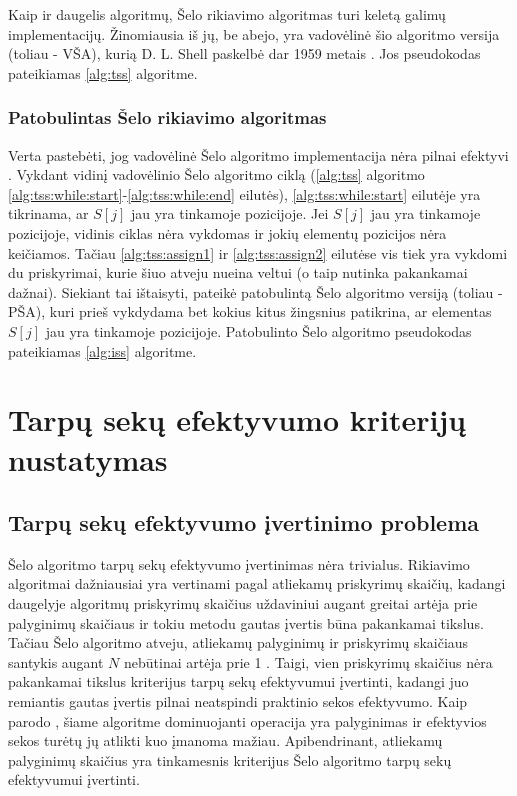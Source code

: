 \documentclass{VUMIFInfKursinis}
\begin{document}
Kaip ir daugelis algoritmų, Šelo rikiavimo algoritmas turi keletą galimų implementacijų.
Žinomiausia iš jų, be abejo, yra vadovėlinė šio algoritmo versija (toliau - VŠA),
kurią D. L. Shell paskelbė dar 1959 metais \cite{shell1959high}.
Jos pseudokodas pateikiamas \ref{alg:tss} algoritme.

\subsubsection{Patobulintas Šelo rikiavimo algoritmas}

Verta pastebėti, jog vadovėlinė Šelo algoritmo implementacija nėra pilnai efektyvi \cite{Radavičius_Baranauskas_2013}.
Vykdant vidinį vadovėlinio Šelo algoritmo ciklą (\ref{alg:tss} algoritmo \ref{alg:tss:while:start}-\ref{alg:tss:while:end} eilutės),
\ref{alg:tss:while:start} eilutėje yra tikrinama, ar $S[j]$ jau yra tinkamoje pozicijoje.
Jei $S[j]$ jau yra tinkamoje pozicijoje, vidinis ciklas nėra vykdomas ir jokių elementų pozicijos nėra keičiamos.
Tačiau \ref{alg:tss:assign1} ir \ref{alg:tss:assign2} eilutėse vis tiek yra vykdomi du priskyrimai,
kurie šiuo atveju nueina veltui (o taip nutinka pakankamai dažnai).
Siekiant tai ištaisyti, \cite{Radavičius_Baranauskas_2013} pateikė patobulintą Šelo algoritmo versiją (toliau - PŠA), kuri prieš vykdydama
bet kokius kitus žingsnius patikrina, ar elementas $S[j]$ jau yra tinkamoje pozicijoje.
Patobulinto Šelo algoritmo pseudokodas pateikiamas \ref{alg:iss} algoritme.

\section{Tarpų sekų efektyvumo kriterijų nustatymas}

\subsection{Tarpų sekų efektyvumo įvertinimo problema}

Šelo algoritmo tarpų sekų efektyvumo įvertinimas nėra trivialus.
Rikiavimo algoritmai dažniausiai yra vertinami pagal atliekamų priskyrimų skaičių, kadangi
daugelyje algoritmų priskyrimų skaičius uždaviniui augant greitai artėja prie palyginimų skaičiaus ir
tokiu metodu gautas įvertis būna pakankamai tikslus.
Tačiau Šelo algoritmo atveju, atliekamų palyginimų ir priskyrimų skaičiaus santykis augant $N$ nebūtinai artėja prie 1 \cite{Radavičius_Baranauskas_2013}.
Taigi, vien priskyrimų skaičius nėra pakankamai tikslus kriterijus tarpų sekų efektyvumui įvertinti,
kadangi juo remiantis gautas įvertis pilnai neatspindi praktinio sekos efektyvumo.
Kaip parodo \cite{ciura2001best}, šiame algoritme dominuojanti operacija yra palyginimas ir efektyvios sekos
turėtų jų atlikti kuo įmanoma mažiau.
Apibendrinant, atliekamų palyginimų skaičius yra tinkamesnis kriterijus Šelo algoritmo tarpų sekų efektyvumui įvertinti.
\end{document}
